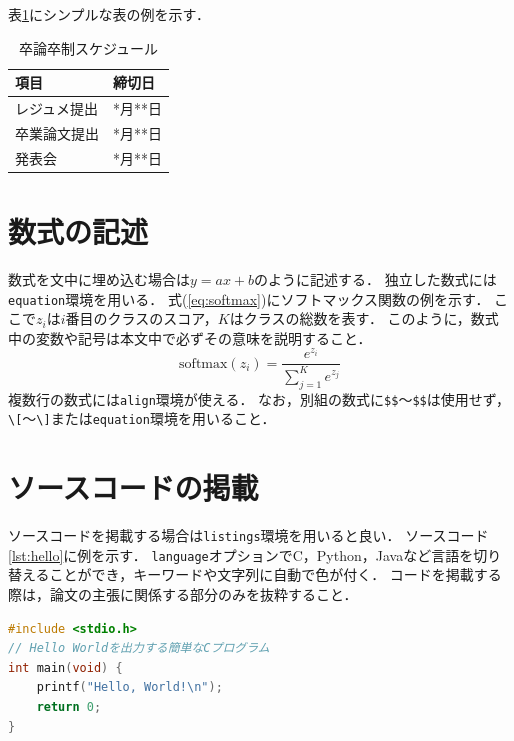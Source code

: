 表\ref{tab:schedule}にシンプルな表の例を示す．

\begin{table}[tb]
    \centering
    \caption{卒論卒制スケジュール}
    \label{tab:schedule}
    \begin{tabular}{ll}\toprule
        項目       & 締切日  \\ \midrule
        レジュメ提出 & *月**日 \\
        卒業論文提出 & *月**日 \\
        発表会     & *月**日 \\ \bottomrule
    \end{tabular}
\end{table}

\section{数式の記述}
\label{sec:math}

数式を文中に埋め込む場合は$y = ax + b$のように記述する．
独立した数式には\texttt{equation}環境を用いる．
式(\ref{eq:softmax})にソフトマックス関数の例を示す．
ここで$z_i$は$i$番目のクラスのスコア，$K$はクラスの総数を表す．
このように，数式中の変数や記号は本文中で必ずその意味を説明すること．
\begin{equation}
    \label{eq:softmax}
    \mathrm{softmax}(z_i) = \frac{e^{z_i}}{\sum_{j=1}^{K} e^{z_j}}
\end{equation}
複数行の数式には\texttt{align}環境が使える．
なお，別組の数式に\verb|$$|〜\verb|$$|は使用せず，\verb|\[|〜\verb|\]|または\texttt{equation}環境を用いること．

\section{ソースコードの掲載}
\label{sec:code}

ソースコードを掲載する場合は\texttt{listings}環境を用いると良い．
ソースコード\ref{lst:hello}に例を示す．
\texttt{language}オプションでC，Python，Javaなど言語を切り替えることができ，キーワードや文字列に自動で色が付く．
コードを掲載する際は，論文の主張に関係する部分のみを抜粋すること．

\begin{lstlisting}[caption={Hello Worldの例}, label={lst:hello}, language=c, float=tb]
#include <stdio.h>
// Hello Worldを出力する簡単なCプログラム
int main(void) {
    printf("Hello, World!\n");
    return 0;
}
\end{lstlisting}


